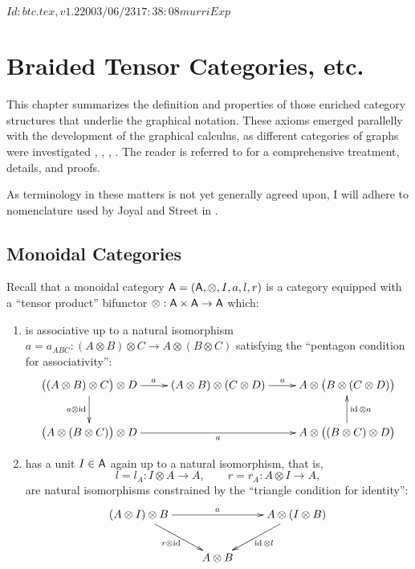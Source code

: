 \RCSID $Id: btc.tex,v 1.2 2003/06/23 17:38:08 murri Exp $


\chapter{Braided Tensor Categories, etc.}
\label{cha:btc}

This chapter summarizes the definition and properties of those
enriched category structures that underlie the graphical notation.
These axioms emerged parallelly with the development of the graphical
calculus, as different categories of graphs were investigated
\cite{turaev;yang-baxter}, \cite{freyd-yetter;btc},
\cite{joyal-street;tensor-calculus}, \cite{shum;tortile-categories}.
The reader is referred to \cite{joyal-street;btc} for a comprehensive
treatment, details, and proofs.

As terminology in these matters is not yet generally agreed upon, I
will adhere to nomenclature used by Joyal and Street in
\cite{joyal-street;tensor-calculus, joyal-street;btc}. 


\section{Monoidal Categories}
\label{sec:monoidal-categories}

Recall that a monoidal category $\mathsf{A} = (\mathsf{A}, \otimes, I, a, l, r)$ is a
category equipped with a ``tensor product'' bifunctor $\otimes: \mathsf{A} \times \mathsf{A} \to
\mathsf{A}$ which:
\begin{enumerate}
\item is associative up to a natural isomorphism $a = a_{ABC}:
  (A\otimes B)\otimes C \to A\otimes(B\otimes C)$ satisfying the ``pentagon condition for
  associativity'': 
  \begin{equation*}
    \xymatrix{%
      \bigl((A\otimes B)\otimes C\bigr)\otimes D
      &
      (A\otimes B) \otimes (C\otimes D)
      &
      A \otimes \bigl(B\otimes(C\otimes D)\bigr)
      \\
      \bigl(A\otimes(B\otimes C)\bigr) \otimes D
      &
      &
      A\otimes\bigl((B\otimes C)\otimes D\bigr)
      \ar "1,1";"1,2"^{a}
      \ar "1,2";"1,3"^{a}
      \ar "1,1";"2,1"_{a \otimes \id}
      \ar "2,1";"2,3"_{a}
      \ar "2,3";"1,3"_{\id \otimes a}
      }
  \end{equation*}
\item has a unit $I \in \mathsf{A}$ again up to a natural isomorphism, that is,
  \begin{equation*}
    l = l_A: I \otimes A \to A, \qquad r = r_A: A \otimes I \to A,
  \end{equation*}
  are natural isomorphisms constrained by the ``triangle condition for
  identity'':
  \begin{equation*}
    \xymatrix{%
      (A \otimes I) \otimes B
      &
      &
      A \otimes (I \otimes B)
      \\
      &
      A \otimes B
      &
      \ar "1,1";"1,3"^{a}
      \ar "1,1";"2,2"_{r \otimes \id}
      \ar "1,3";"2,2"^{\id \otimes l}
      }
  \end{equation*}
\end{enumerate}

